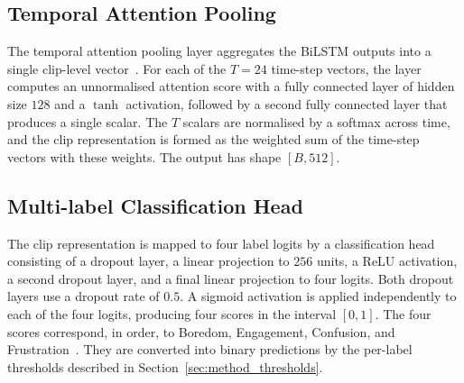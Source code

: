 \subsection{Temporal Attention Pooling}\label{sec:method_temporal_attention}

The temporal attention pooling layer aggregates the \ac{BiLSTM} outputs into a single clip-level vector~\cite{vaswani_attention_2017}. For each of the $T = 24$ time-step vectors, the layer computes an unnormalised attention score with a fully connected layer of hidden size $128$ and a $\tanh$ activation, followed by a second fully connected layer that produces a single scalar. The $T$ scalars are normalised by a softmax across time, and the clip representation is formed as the weighted sum of the time-step vectors with these weights. The output has shape $[B, 512]$.

\subsection{Multi-label Classification Head}\label{sec:method_head}

The clip representation is mapped to four label logits by a classification head consisting of a dropout layer, a linear projection to $256$ units, a ReLU activation, a second dropout layer, and a final linear projection to four logits. Both dropout layers use a dropout rate of $0.5$. A sigmoid activation is applied independently to each of the four logits, producing four scores in the interval $[0,1]$. The four scores correspond, in order, to Boredom, Engagement, Confusion, and Frustration~\cite{gupta_daisee_2016}. They are converted into binary predictions by the per-label thresholds described in Section~\ref{sec:method_thresholds}.

